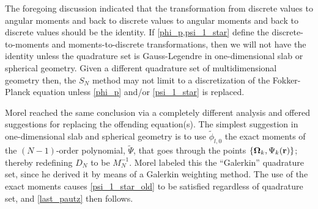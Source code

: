 The foregoing discussion indicated that the transformation from discrete
values to angular moments and back to discrete values to angular moments and
back to discrete values should be the identity. If \cref{phi_p,psi_1_star} define 
the discrete-to-moments and moments-to-discrete transformations, then we will 
not have the identity unless the quadrature set is Gauss-Legendre in one-dimensional 
slab or spherical geometry. Given a different quadrature set of multidimensional 
geometry then, the $S_N$ method may not limit to a discretization of the 
Fokker-Planck equation unless \cref{phi_p} and/or \cref{psi_1_star} is replaced.

Morel\cite{galerkin_morel} reached the same conclusion via a completely
different analysis and offered suggestions for replacing the offending
equation(s). The simplest suggestion in one-dimensional slab and spherical
geometry is to use $\tilde{\phi}_{l,0}$ the exact moments of the $(N-1)$-order
polynomial, $\tilde{\Psi}$, that goes through the points
$\{\boldsymbol{\Omega}_k,\Psi_k(\mathbf{r})\}$; thereby redefining $D_N$ to be $M_N^{-1}$. Morel
labeled this the ``Galerkin'' quadrature set, since he derived it by means of
a Galerkin weighting method. The use of the exact moments causes
\cref{psi_1_star_old} to be satisfied regardless of quadrature set, and
\cref{last_pautz} then follows.


